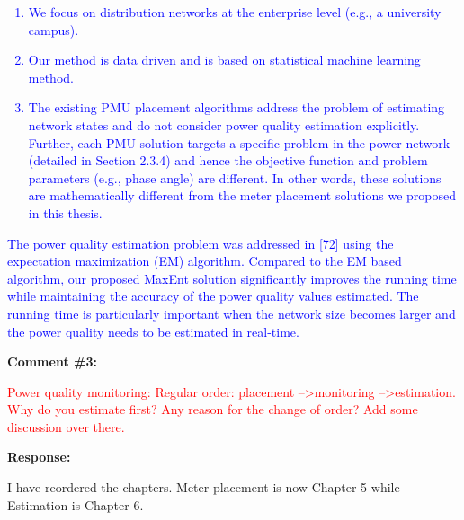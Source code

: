 \documentclass[journal]{IEEEtran}
\begin{document}
\vspace{-1em}
\begin{adjustwidth}{3.5em}{0pt}
\noindent\textcolor{blue}{
\begin{enumerate}
\item We focus on distribution networks at the enterprise level (e.g., a university
campus).
\item Our method is data driven and is based on statistical machine learning method.
\item The existing PMU placement algorithms address the problem of estimating network states and do not consider power quality estimation explicitly. Further, each PMU solution targets a specific problem in the power network (detailed in Section 2.3.4) and hence the objective function and problem parameters (e.g., phase angle) are different. In other words, these solutions are mathematically different from the meter placement solutions we proposed in this thesis.
\end{enumerate}
}
\end{adjustwidth}

\begin{adjustwidth}{2.5em}{0pt}
\noindent\textcolor{blue}{The power quality estimation problem was addressed in [72] using the expectation maximization (EM) algorithm. Compared to the EM based algorithm, our proposed MaxEnt solution significantly improves the running time while maintaining the accuracy of the power quality values estimated. The running time is particularly important when the network size becomes larger and the power quality needs to be estimated in real-time.}
\end{adjustwidth}

\vspace{30pt}
\textbf{Comment \#3:}
\begin{adjustwidth}{2.5em}{0pt}
\singlespacing \vspace{-10pt}
\textcolor{red}{Power quality monitoring: Regular order: placement --\textgreater monitoring --\textgreater estimation. Why do you estimate first? Any reason for the change of order? Add some discussion over there.}
\end{adjustwidth}

\vspace{10pt}
\textbf{Response:}
\begin{adjustwidth}{2.5em}{0pt}
I have reordered the chapters. Meter placement is now Chapter 5 while Estimation is Chapter 6.
\end{adjustwidth}
\end{document}
